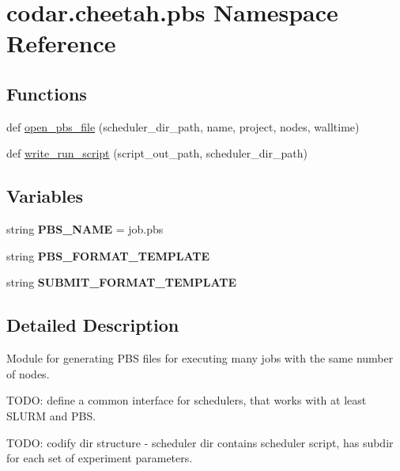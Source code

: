 \hypertarget{namespacecodar_1_1cheetah_1_1pbs}{}\section{codar.\+cheetah.\+pbs Namespace Reference}
\label{namespacecodar_1_1cheetah_1_1pbs}
\subsection*{Functions}
\begin{DoxyCompactItemize}
\item 
def \hyperlink{namespacecodar_1_1cheetah_1_1pbs_a2d1652f1349a664f93598c2ea3c20896}{open\+\_\+pbs\+\_\+file} (scheduler\+\_\+dir\+\_\+path, name, project, nodes, walltime)
\item 
def \hyperlink{namespacecodar_1_1cheetah_1_1pbs_a911aa8a83bd8b0fd8f750ea66d410851}{write\+\_\+run\+\_\+script} (script\+\_\+out\+\_\+path, scheduler\+\_\+dir\+\_\+path)
\end{DoxyCompactItemize}
\subsection*{Variables}
\begin{DoxyCompactItemize}
\item 
\mbox{\label{namespacecodar_1_1cheetah_1_1pbs_a19167ffbdc5b9b468b3368c09ba8fe1f}} 
string {\bfseries P\+B\+S\+\_\+\+N\+A\+ME} = \textquotesingle{}job.\+pbs\textquotesingle{}
\item 
string {\bfseries P\+B\+S\+\_\+\+F\+O\+R\+M\+A\+T\+\_\+\+T\+E\+M\+P\+L\+A\+TE}
\item 
string {\bfseries S\+U\+B\+M\+I\+T\+\_\+\+F\+O\+R\+M\+A\+T\+\_\+\+T\+E\+M\+P\+L\+A\+TE}
\end{DoxyCompactItemize}


\subsection{Detailed Description}
\begin{DoxyVerb}Module for generating PBS files for executing many jobs with the same
number of nodes.

TODO: define a common interface for schedulers, that works with at least
SLURM and PBS.

TODO: codify dir structure - scheduler dir contains scheduler script, has
subdir for each set of experiment parameters.
\end{DoxyVerb}
 

